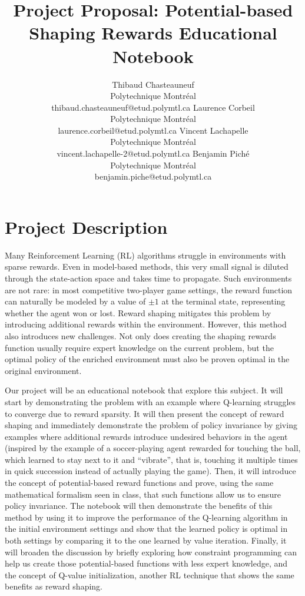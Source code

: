 \documentclass{article}
\title{Project Proposal: Potential-based Shaping Rewards Educational Notebook}
\author{
  Thibaud Chasteauneuf \\ Polytechnique Montréal \\ thibaud.chasteauneuf@etud.polymtl.ca
  \And
  Laurence Corbeil \\ Polytechnique Montréal \\ laurence.corbeil@etud.polymtl.ca
  \And
  Vincent Lachapelle \\ Polytechnique Montréal \\ vincent.lachapelle-2@etud.polymtl.ca
  \And
  Benjamin Piché \\ Polytechnique Montréal \\ benjamin.piche@etud.polymtl.ca
}
\begin{document}
\maketitle


\section*{Project Description}

Many Reinforcement Learning (RL) algorithms struggle in environments with sparse rewards. Even in model-based methods, this very small signal is diluted through the state-action space and takes time to propagate. Such environments are not rare: in most competitive two-player game settings, the reward function can naturally be modeled by a value of $ \pm 1 $ at the terminal state, representing whether the agent won or lost. Reward shaping mitigates this problem by introducing additional rewards within the environment. However, this method also introduces new challenges. Not only does creating the shaping rewards function usually require expert knowledge on the current problem, but the optimal policy of the enriched environment must also be proven optimal in the original environment.

Our project will be an educational notebook that explore this subject. It will start by demonstrating the problem with an example where Q-learning struggles to converge due to reward sparsity. It will then present the concept of reward shaping and immediately demonstrate the problem of policy invariance by giving examples where additional rewards introduce undesired behaviors in the agent (inspired by the example of a soccer-playing agent rewarded for touching the ball, which learned to stay next to it and ``vibrate'', that is, touching it multiple times in quick succession instead of actually playing the game). Then, it will introduce the concept of potential-based reward functions and prove, using the same mathematical formalism seen in class, that such functions allow us to ensure policy invariance. The notebook will then demonstrate the benefits of this method by using it to improve the performance of the Q-learning algorithm in the initial environment settings and show that the learned policy is optimal in both settings by comparing it to the one learned by value iteration. Finally, it will broaden the discussion by briefly exploring how constraint programming can help us create those potential-based functions with less expert knowledge, and the concept of Q-value initialization, another RL technique that shows the same benefits as reward shaping.
\end{document}
